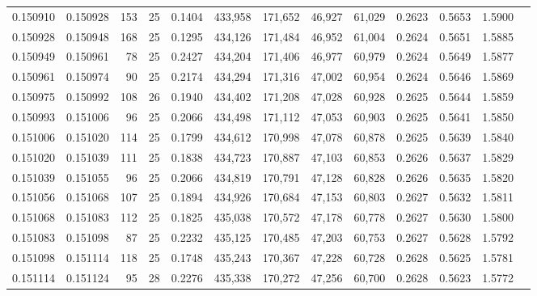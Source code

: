 \begin{tabular}{rrrrrrrrrrrrr}
0.150910 & 0.150928 &   153 &  25 &                                     0.1404 & 433,958 & 171,652 &  46,927 &  61,029 & 0.2623 & 0.5653 & 1.5900 \\
0.150928 & 0.150948 &   168 &  25 &                                     0.1295 & 434,126 & 171,484 &  46,952 &  61,004 & 0.2624 & 0.5651 & 1.5885 \\
0.150949 & 0.150961 &    78 &  25 &                                     0.2427 & 434,204 & 171,406 &  46,977 &  60,979 & 0.2624 & 0.5649 & 1.5877 \\
0.150961 & 0.150974 &    90 &  25 &                                     0.2174 & 434,294 & 171,316 &  47,002 &  60,954 & 0.2624 & 0.5646 & 1.5869 \\
0.150975 & 0.150992 &   108 &  26 &                                     0.1940 & 434,402 & 171,208 &  47,028 &  60,928 & 0.2625 & 0.5644 & 1.5859 \\
0.150993 & 0.151006 &    96 &  25 &                                     0.2066 & 434,498 & 171,112 &  47,053 &  60,903 & 0.2625 & 0.5641 & 1.5850 \\
0.151006 & 0.151020 &   114 &  25 &                                     0.1799 & 434,612 & 170,998 &  47,078 &  60,878 & 0.2625 & 0.5639 & 1.5840 \\
0.151020 & 0.151039 &   111 &  25 &                                     0.1838 & 434,723 & 170,887 &  47,103 &  60,853 & 0.2626 & 0.5637 & 1.5829 \\
0.151039 & 0.151055 &    96 &  25 &                                     0.2066 & 434,819 & 170,791 &  47,128 &  60,828 & 0.2626 & 0.5635 & 1.5820 \\
0.151056 & 0.151068 &   107 &  25 &                                     0.1894 & 434,926 & 170,684 &  47,153 &  60,803 & 0.2627 & 0.5632 & 1.5811 \\
0.151068 & 0.151083 &   112 &  25 &                                     0.1825 & 435,038 & 170,572 &  47,178 &  60,778 & 0.2627 & 0.5630 & 1.5800 \\
0.151083 & 0.151098 &    87 &  25 &                                     0.2232 & 435,125 & 170,485 &  47,203 &  60,753 & 0.2627 & 0.5628 & 1.5792 \\
0.151098 & 0.151114 &   118 &  25 &                                     0.1748 & 435,243 & 170,367 &  47,228 &  60,728 & 0.2628 & 0.5625 & 1.5781 \\
0.151114 & 0.151124 &    95 &  28 &                                     0.2276 & 435,338 & 170,272 &  47,256 &  60,700 & 0.2628 & 0.5623 & 1.5772 \\

\end{tabular}
